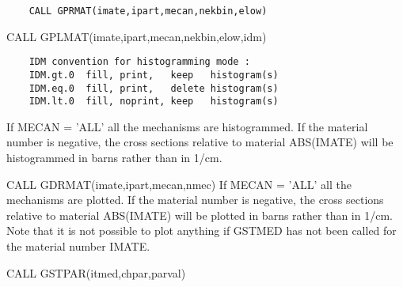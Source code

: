 \begin{verbatim}
    CALL GPRMAT(imate,ipart,mecan,nekbin,elow)
\end{verbatim}

\ENDCMD


\BEGARG
{}
\ENDARG

   \par
CALL GPLMAT(imate,ipart,mecan,nekbin,elow,idm) 
\begin{verbatim}
    IDM convention for histogramming mode :
    IDM.gt.0  fill, print,   keep   histogram(s)
    IDM.eq.0  fill, print,   delete histogram(s)
    IDM.lt.0  fill, noprint, keep   histogram(s)
\end{verbatim}
   \par
If MECAN = 'ALL' all the mechanisms are histogrammed. If the material 
   number is negative, the cross sections relative to material ABS(IMATE) will 
   be histogrammed in barns rather than in 1/cm.  

\ENDCMD


\BEGARG
{}
\ENDARG

   \par
CALL GDRMAT(imate,ipart,mecan,nmec) If MECAN = 'ALL' all the mechanisms are 
   plotted. If the material number is negative, the cross sections relative to 
   material ABS(IMATE) will be plotted in barns rather than in 1/cm.  Note 
   that it is not possible to plot anything if GSTMED has not been called for 
   the material number IMATE.  

\ENDCMD


\BEGARG
{}
\ENDARG

   \par
CALL GSTPAR(itmed,chpar,parval) 

\ENDCMD


